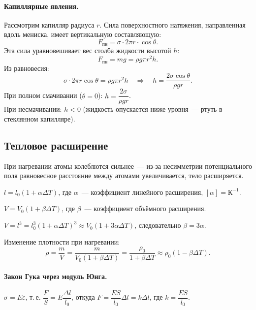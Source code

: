 \documentclass[12pt]{article}
\begin{document}
\paragraph{Капиллярные явления.}

\begin{statement}
	Рассмотрим капилляр радиуса $r$. Сила поверхностного натяжения, направленная вдоль мениска, имеет вертикальную составляющую:
	\[
		F_{\text{пн}} = \sigma \cdot 2\pi r \cdot \cos\theta.
	\]
	Эта сила уравновешивает вес столба жидкости высотой $h$:
	\[
		F_{\text{пн}} = mg = \rho g \pi r^2 h.
	\]
	Из равновесия:
	\[
		\sigma \cdot 2\pi r \cos\theta = \rho g \pi r^2 h \quad \Longrightarrow \quad h = \frac{2\sigma\cos\theta}{\rho g r}.
	\]
	При полном смачивании ($\theta = 0$): $h = \dfrac{2\sigma}{\rho g r}$.\\
	При несмачивании: $h < 0$ (жидкость опускается ниже уровня~--- ртуть в стеклянном капилляре).
\end{statement}

\subsection{Тепловое расширение}

При нагревании атомы колеблются сильнее~--- из-за несимметрии потенциального поля равновесное расстояние между атомами увеличивается, тело расширяется.

\begin{definition}
	$l = l_0(1 + \alpha \Delta T)$, где $\alpha$~--- коэффициент линейного расширения, $[\alpha] = \text{К}^{-1}$.
\end{definition}

\begin{definition}
	$V = V_0(1 + \beta \Delta T)$, где $\beta$~--- коэффициент объёмного расширения.
\end{definition}

\begin{statement}
	$V = l^3 = l_0^3(1+\alpha\Delta T)^3 \approx V_0(1 + 3\alpha\Delta T)$, следовательно $\beta = 3\alpha$.
\end{statement}

Изменение плотности при нагревании:
\[
	\rho = \frac{m}{V} = \frac{m}{V_0(1 + \beta\Delta T)} = \frac{\rho_0}{1 + \beta\Delta T} \approx \rho_0(1 - \beta\Delta T).
\]

\paragraph{Закон Гука через модуль Юнга.}
$\sigma = E \varepsilon$, т.\,е. $\dfrac{F}{S} = E \dfrac{\Delta l}{l_0}$, откуда $F = \dfrac{ES}{l_0}\Delta l = k\Delta l$, где $k = \dfrac{ES}{l_0}$.
\end{document}
